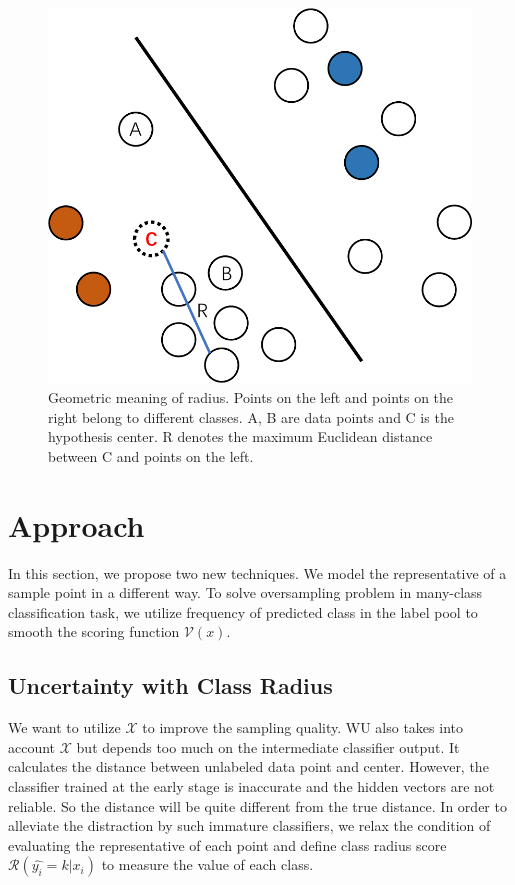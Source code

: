 \begin{figure}[th]
\centering
\includegraphics[scale=0.3]{figs/radius.pdf}
\caption{Geometric meaning of radius. Points on the left and points on the right
belong to different classes. A, B are data points and C is the hypothesis center. 
R denotes the maximum Euclidean distance between C and points on the left.}
\label{fig:radius}
\end{figure}


\section{Approach}
\label{sec:appraoch}
In this section, we propose two new techniques. We model the representative of a sample
point in a different way. To solve oversampling problem in many-class classification task, we utilize frequency of predicted class in the label pool to smooth the scoring function $\mathcal{V}(x)$.

\subsection{Uncertainty with Class Radius}
We want to utilize $\mathcal{X}$ to improve the sampling quality. 
WU also takes into account $\mathcal{X}$ but depends too much on the 
intermediate classifier output. It calculates the distance
between unlabeled data point and center. 
However, the classifier trained at the early stage
is inaccurate and the hidden vectors are not reliable. 
So the distance will be quite different from the true distance. 
In order to alleviate the distraction by such immature classifiers, we relax the condition of evaluating the representative of each point and define class radius score $\mathcal{R}(\hat{y_i}=k|x_i)$ to measure the value of each class. 
    
